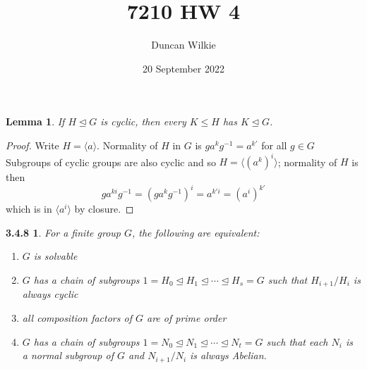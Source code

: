 \documentclass{article}
\title{7210 HW 4}
\author{Duncan Wilkie}
\date{20 September 2022}
\newcommand{\nsub}{\trianglelefteq}
\newtheorem*{3.4.8}{3.4.8}
\newtheorem{lem}{Lemma}
\begin{document}
\maketitle

\begin{lem}
  If $H \nsub G$ is cyclic, then every $K \leq H$ has $K \nsub G$.
\end{lem}

\begin{proof}
  Write $H = \langle a \rangle$.
  Normality of $H$ in $G$ is $ga^{k}g^{-1} = a^{k'}$ for all $g \in G$
  Subgroups of cyclic groups are also cyclic and so $H = \langle (a^k)^{i} \rangle$; normality of $H$ is then
  \[
    ga^{ki}g^{-1} = (ga^{k}g^{-1})^{i} = a^{k'i} = (a^{i})^{k'}
  \]
  which is in $\langle a^{i} \rangle$ by closure.
\end{proof}

\begin{3.4.8}
  For a finite group $G$, the following are equivalent:
  \begin{enumerate}
  \item $G$ is solvable
  \item $G$ has a chain of subgroups $1 = H_{0} \nsub H_{1} \nsub \cdots \nsub H_{s} = G$ such that $H_{i+1}/H_{i}$ is always cyclic
  \item all composition factors of $G$ are of prime order
  \item $G$ has a chain of subgroups $1 = N_{0} \nsub N_{1} \nsub \cdots \nsub N_{t} = G$
    such that each $N_{i}$ is a normal subgroup of $G$ and $N_{i+1} / N_{i}$ is always Abelian.
  \end{enumerate}
\end{3.4.8}
\end{document}

